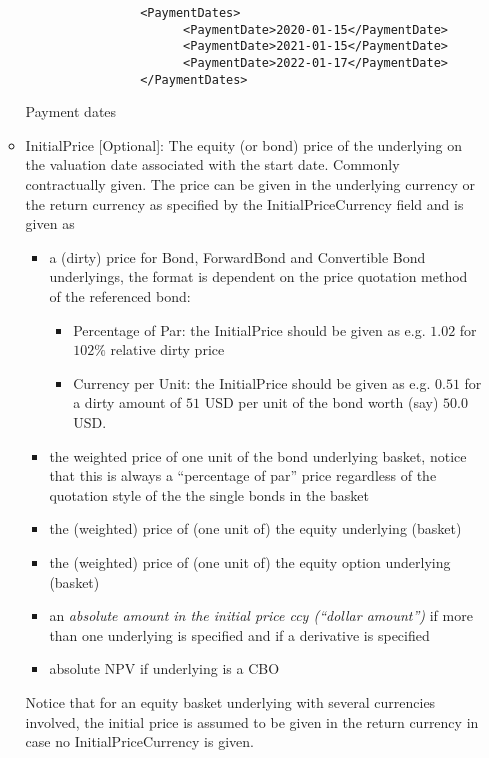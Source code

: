 \begin{itemize}
\begin{itemize}
    \begin{listing}[H]
\begin{verbatim}
                <PaymentDates>
                      <PaymentDate>2020-01-15</PaymentDate>
                      <PaymentDate>2021-01-15</PaymentDate>
                      <PaymentDate>2022-01-17</PaymentDate>
                </PaymentDates>
\end{verbatim}
\caption{Payment dates}
\label{lst:paymentdatestrs}
\end{listing}
    
  \item InitialPrice [Optional]: The equity (or bond) price of the underlying
    on the valuation date associated with the start date. Commonly contractually given. The price can be given in the
    underlying currency or the return currency as specified by the InitialPriceCurrency field and is given as
    \begin{itemize}
    \item a (dirty) price for Bond, ForwardBond and Convertible Bond underlyings, the format is dependent on the price quotation method of the referenced bond:
      \begin{itemize}
      \item Percentage of Par: the InitialPrice should be given as e.g. $1.02$ for $102\%$ relative dirty price
      \item Currency per Unit: the InitialPrice should be given as e.g. $0.51$ for a dirty amount of $51$ USD per unit
        of the bond worth (say) $50.0$ USD.
      \end{itemize}
      \item the weighted price of one unit of the bond underlying basket, notice that this is always a ``percentage of
        par'' price regardless of the quotation style of the the single bonds in the basket
      \item the (weighted) price of (one unit of) the equity underlying (basket)
      \item the (weighted) price of (one unit of) the equity option underlying (basket)
      \item an {\em absolute amount in the initial price ccy (``dollar amount'')} if more than one underlying is
        specified and if a derivative is specified
      \item absolute NPV if underlying is a CBO
    \end{itemize}
    Notice that for an equity basket underlying with several currencies involved, the initial price is assumed to be given in the
    return currency in case no InitialPriceCurrency is given.


\end{itemize}
\end{itemize}
